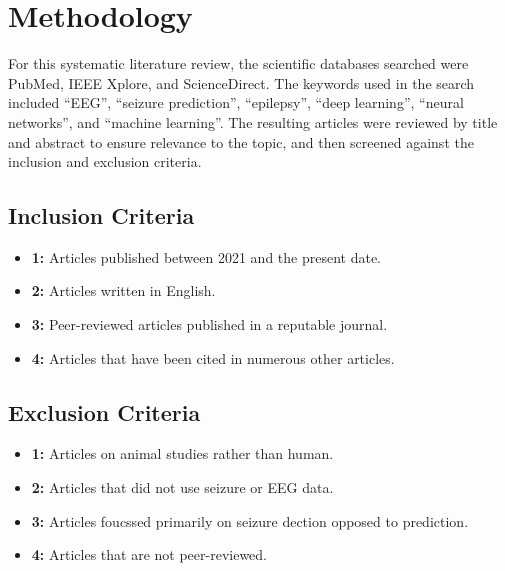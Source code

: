 \documentclass[conference]{IEEEtran}
\begin{document}
\section{Methodology}
For this systematic literature review, the scientific databases searched were PubMed, IEEE Xplore, and ScienceDirect. The keywords used in the search included “EEG”, “seizure prediction”, “epilepsy”, “deep learning”, “neural networks”, and “machine learning”. The resulting articles were reviewed by title and abstract to ensure relevance to the topic, and then screened against the inclusion and exclusion criteria.  

\subsection{Inclusion Criteria}
\begin{itemize}
  \item \textbf{1:} Articles published between 2021 and the present date.
  \item \textbf{2:} Articles written in English.
  \item \textbf{3:} Peer-reviewed articles published in a reputable journal.
  \item \textbf{4:} Articles that have been cited in numerous other articles.
\end{itemize}

\subsection{Exclusion Criteria}
\begin{itemize}
  \item \textbf{1:} Articles on animal studies rather than human.
  \item \textbf{2:} Articles that did not use seizure or EEG data.
  \item \textbf{3:} Articles foucssed primarily on seizure dection opposed to prediction.
  \item \textbf{4:} Articles that are not peer-reviewed.
\end{itemize}

\end{document}
